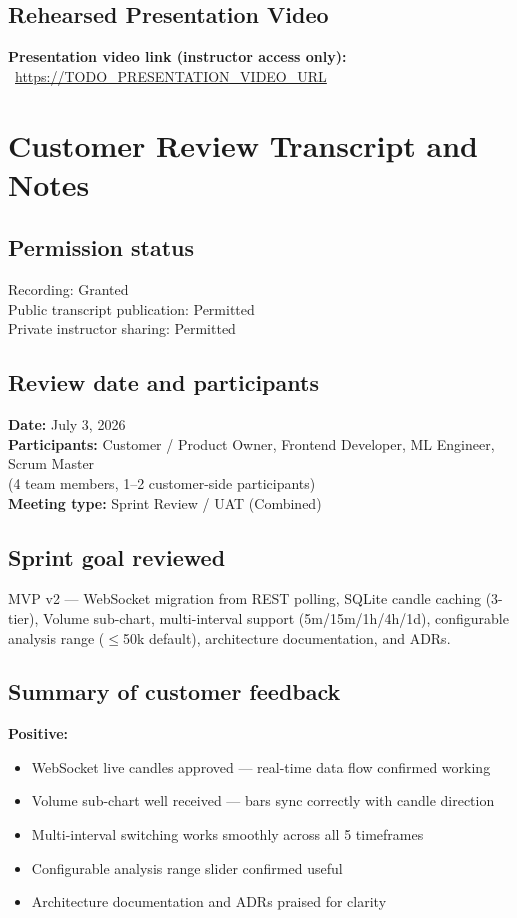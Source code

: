 \documentclass[11pt,a4paper]{article}
\begin{document}
\subsection{Rehearsed Presentation Video}
\textbf{Presentation video link (instructor access only):} \
\url{https://TODO_PRESENTATION_VIDEO_URL}

\section{Customer Review Transcript and Notes}

\subsection{Permission status}
Recording: Granted \\
Public transcript publication: Permitted \\
Private instructor sharing: Permitted

\subsection{Review date and participants}
\textbf{Date:} July 3, 2026 \\
\textbf{Participants:} Customer / Product Owner, Frontend Developer, ML Engineer, Scrum Master \\
(4 team members, 1--2 customer-side participants) \\
\textbf{Meeting type:} Sprint Review / UAT (Combined)

\subsection{Sprint goal reviewed}
MVP v2 --- WebSocket migration from REST polling, SQLite candle caching (3-tier), Volume sub-chart, multi-interval support (5m/15m/1h/4h/1d), configurable analysis range ($\leq$50k default), architecture documentation, and ADRs.

\subsection{Summary of customer feedback}
\textbf{Positive:}
\begin{itemize}
    \item WebSocket live candles approved --- real-time data flow confirmed working
    \item Volume sub-chart well received --- bars sync correctly with candle direction
    \item Multi-interval switching works smoothly across all 5 timeframes
    \item Configurable analysis range slider confirmed useful
    \item Architecture documentation and ADRs praised for clarity
\end{itemize}
\end{document}
